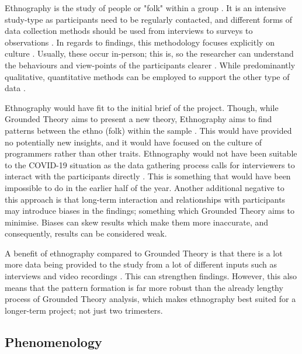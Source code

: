 Ethnography is the study of people or "folk" within a group \cite{ethno}. It is an intensive study-type as participants need to be regularly contacted, and different forms of data collection methods should be used from interviews to surveys to observations \cite{ethno}. In regards to findings, this methodology focuses explicitly on culture \cite{ethno}. Usually, these occur in-person; this is, so the researcher can understand the behaviours and view-points of the participants clearer \cite{ethno}.  While predominantly qualitative, quantitative methods can be employed to support the other type of data \cite{ethno}. 
\newline
\par 
Ethnography would have fit to the initial brief of the project. Though, while Grounded Theory aims to present a new theory, Ethnography aims to find patterns between the ethno (folk) within the sample \cite{ethno}. This would have provided no potentially new insights, and it would have focused on the culture of programmers rather than other traits. Ethnography would not have been suitable to the COVID-19 situation as the data gathering process calls for interviewers to interact with the participants directly \cite{ethno}. This is something that would have been impossible to do in the earlier half of the year. Another additional negative to this approach is that long-term interaction and relationships with participants may introduce biases in the findings; something which Grounded Theory aims to minimise. Biases can skew results which make them more inaccurate, and consequently, results can be considered weak. 
 \newline
 \par
 A benefit of ethnography compared to Grounded Theory is that there is a lot more data being provided to the study from a lot of different inputs such as interviews and video recordings \cite{ethno}. This can strengthen findings. However, this also means that the pattern formation is far more robust than the already lengthy process of Grounded Theory analysis, which makes ethnography best suited for a longer-term project; not just two trimesters. 

\subsection{Phenomenology}

